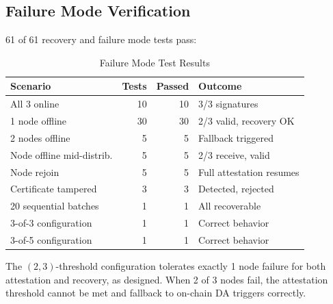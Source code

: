 \subsection{Failure Mode Verification}

61 of 61 recovery and failure mode tests pass:

\begin{table}[h]
\centering
\caption{Failure Mode Test Results}
\label{tab:failure}
\begin{tabular}{lrrl}
\toprule
\textbf{Scenario} & \textbf{Tests} & \textbf{Passed} & \textbf{Outcome} \\
\midrule
All 3 online            & 10 & 10 & 3/3 signatures \\
1 node offline          & 30 & 30 & 2/3 valid, recovery OK \\
2 nodes offline         & 5  & 5  & Fallback triggered \\
Node offline mid-distrib. & 5 & 5 & 2/3 receive, valid \\
Node rejoin             & 5  & 5  & Full attestation resumes \\
Certificate tampered    & 3  & 3  & Detected, rejected \\
20 sequential batches   & 1  & 1  & All recoverable \\
3-of-3 configuration   & 1  & 1  & Correct behavior \\
3-of-5 configuration   & 1  & 1  & Correct behavior \\
\bottomrule
\end{tabular}
\end{table}

The $(2,3)$-threshold configuration tolerates exactly 1 node failure for both
attestation and recovery, as designed. When 2 of 3 nodes fail, the attestation
threshold cannot be met and fallback to on-chain DA triggers correctly.
